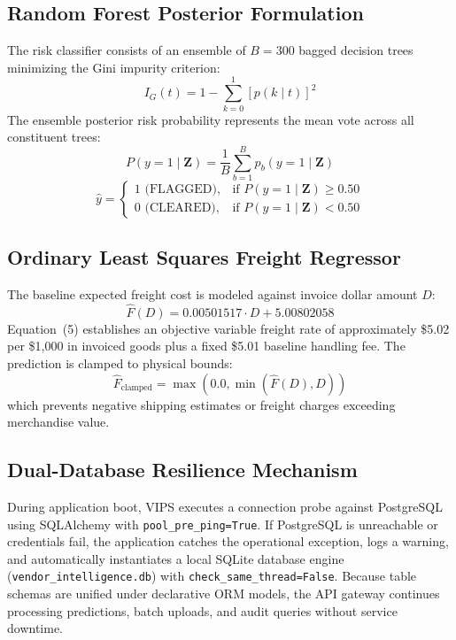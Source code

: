 \documentclass[conference]{IEEEtran}
\begin{document}
\subsection{Random Forest Posterior Formulation}
The risk classifier consists of an ensemble of $B = 300$ bagged decision trees minimizing the Gini impurity criterion:
\begin{equation}
I_G(t) = 1 - \sum_{k=0}^{1} [p(k \mid t)]^2
\end{equation}
The ensemble posterior risk probability represents the mean vote across all constituent trees:
\begin{equation}
P(y=1 \mid \mathbf{Z}) = \frac{1}{B} \sum_{b=1}^{B} p_b(y=1 \mid \mathbf{Z})
\end{equation}
\begin{equation}
\hat{y} = 
\begin{cases} 
1 \text{ (FLAGGED)}, & \text{if } P(y=1 \mid \mathbf{Z}) \ge 0.50 \\ 
0 \text{ (CLEARED)}, & \text{if } P(y=1 \mid \mathbf{Z}) < 0.50 
\end{cases}
\end{equation}

\subsection{Ordinary Least Squares Freight Regressor}
The baseline expected freight cost is modeled against invoice dollar amount $D$:
\begin{equation}
\hat{F}(D) = 0.00501517 \cdot D + 5.00802058
\end{equation}
Equation~(5) establishes an objective variable freight rate of approximately \$5.02 per \$1,000 in invoiced goods plus a fixed \$5.01 baseline handling fee. The prediction is clamped to physical bounds:
\begin{equation}
\hat{F}_{\text{clamped}} = \max(0.0, \min(\hat{F}(D), D))
\end{equation}
which prevents negative shipping estimates or freight charges exceeding merchandise value.

\subsection{Dual-Database Resilience Mechanism}
During application boot, VIPS executes a connection probe against PostgreSQL using SQLAlchemy with \texttt{pool\_pre\_ping=True}. If PostgreSQL is unreachable or credentials fail, the application catches the operational exception, logs a warning, and automatically instantiates a local SQLite database engine (\texttt{vendor\_intelligence.db}) with \texttt{check\_same\_thread=False}. Because table schemas are unified under declarative ORM models, the API gateway continues processing predictions, batch uploads, and audit queries without service downtime.
\end{document}
